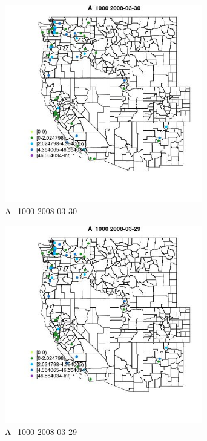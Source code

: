 \begin{figure} 
\centering  
\includegraphics[width=0.77\textwidth]{Code_Outputs/Report_ML_input_PM25_Step4_part_e_de_duplicated_aves_MapObsA_10002008-03-30.jpg} 
\caption{\label{fig:Report_ML_input_PM25_Step4_part_e_de_duplicated_avesMapObsA_10002008-03-30}A_1000 2008-03-30} 
\end{figure} 
 

\begin{figure} 
\centering  
\includegraphics[width=0.77\textwidth]{Code_Outputs/Report_ML_input_PM25_Step4_part_e_de_duplicated_aves_MapObsA_10002008-03-29.jpg} 
\caption{\label{fig:Report_ML_input_PM25_Step4_part_e_de_duplicated_avesMapObsA_10002008-03-29}A_1000 2008-03-29} 
\end{figure} 
 

